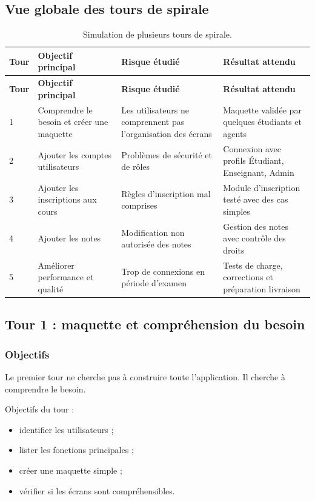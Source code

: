 \documentclass[12pt,a4paper]{article}
\begin{document}
\subsection{Vue globale des tours de spirale}

\begin{longtable}{p{} p{} p{} p{}}
\caption{Simulation de plusieurs tours de spirale.}\\
\toprule
\textbf{Tour} & \textbf{Objectif principal} & \textbf{Risque étudié} & \textbf{Résultat attendu} \\
\midrule
\endfirsthead
\toprule
\textbf{Tour} & \textbf{Objectif principal} & \textbf{Risque étudié} & \textbf{Résultat attendu} \\
\midrule
\endhead
1 & Comprendre le besoin et créer une maquette & Les utilisateurs ne comprennent pas l'organisation des écrans & Maquette validée par quelques étudiants et agents \\
2 & Ajouter les comptes utilisateurs & Problèmes de sécurité et de rôles & Connexion avec profils Étudiant, Enseignant, Admin \\
3 & Ajouter les inscriptions aux cours & Règles d'inscription mal comprises & Module d'inscription testé avec des cas simples \\
4 & Ajouter les notes & Modification non autorisée des notes & Gestion des notes avec contrôle des droits \\
5 & Améliorer performance et qualité & Trop de connexions en période d'examen & Tests de charge, corrections et préparation livraison \\
\bottomrule
\end{longtable}

\subsection{Tour 1 : maquette et compréhension du besoin}

\subsubsection{Objectifs}

Le premier tour ne cherche pas à construire toute l'application. Il cherche à comprendre le besoin.

Objectifs du tour :

\begin{itemize}
    \item identifier les utilisateurs ;
    \item lister les fonctions principales ;
    \item créer une maquette simple ;
    \item vérifier si les écrans sont compréhensibles.
\end{itemize}
\end{document}
